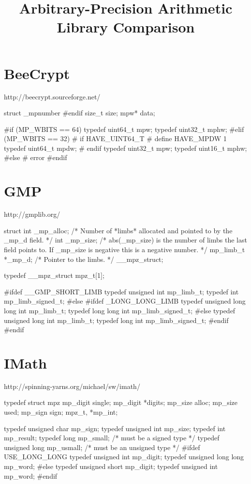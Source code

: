 \documentclass{article}
\title{Arbitrary-Precision Arithmetic\\
Library Comparison}
\begin{document}
\maketitle

\section{BeeCrypt}

http://beecrypt.sourceforge.net/

\begin{verbatimtab}
struct _mpnumber
#endif
{
	size_t	size;
	mpw*	data;
}

#if (MP_WBITS == 64)
typedef uint64_t	mpw;
typedef uint32_t	mphw;
#elif (MP_WBITS == 32)
# if HAVE_UINT64_T
#  define HAVE_MPDW 1
typedef uint64_t	mpdw;
# endif
typedef uint32_t	mpw;
typedef uint16_t	mphw;
#else
# error
#endif
\end{verbatimtab}

\section{GMP}

http://gmplib.org/

\begin{verbatimtab}
struct
{
  int _mp_alloc;    /* Number of *limbs* allocated and pointed
                       to by the _mp_d field.  */
  int _mp_size;     /* abs(_mp_size) is the number of limbs the
                       last field points to.  If _mp_size is
                       negative this is a negative number.  */
  mp_limb_t *_mp_d; /* Pointer to the limbs.  */
} __mpz_struct;

typedef __mpz_struct mpz_t[1];

#ifdef __GMP_SHORT_LIMB
typedef unsigned int		mp_limb_t;
typedef int			mp_limb_signed_t;
#else
#ifdef _LONG_LONG_LIMB
typedef unsigned long long int	mp_limb_t;
typedef long long int		mp_limb_signed_t;
#else
typedef unsigned long int	mp_limb_t;
typedef long int		mp_limb_signed_t;
#endif
#endif
\end{verbatimtab}

\section{IMath}

http://spinning-yarns.org/michael/sw/imath/

\begin{verbatimtab}
typedef struct mpz {
  mp_digit    single;
  mp_digit   *digits;
  mp_size     alloc;
  mp_size     used;
  mp_sign     sign;
} mpz_t, *mp_int;

typedef unsigned char      mp_sign;
typedef unsigned int       mp_size;
typedef int                mp_result;
typedef long               mp_small;  /* must be a signed type */
typedef unsigned long      mp_usmall; /* must be an unsigned type */
#ifdef USE_LONG_LONG
typedef unsigned int       mp_digit;
typedef unsigned long long mp_word;
#else
typedef unsigned short     mp_digit;
typedef unsigned int       mp_word;
#endif
\end{verbatimtab}
\end{document}

